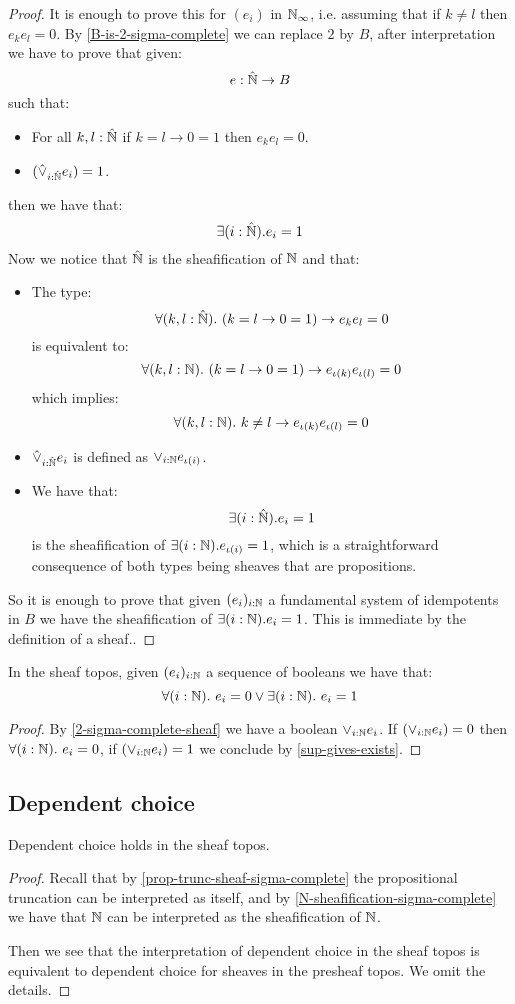 \begin{proof}
It is enough to prove this for $(e_i)$ in $\mathbb{N}_\infty$, i.e. assuming that if $k\not=l$ then $e_ke_l = 0$. By 
\cref{B-is-2-sigma-complete} we can replace $2$ by $B$, after interpretation we have to prove that given:
\[e:\hat{\mathbb{N}}\to B\] 
such that:
\begin{itemize}
\item For all $k,l:\hat{\mathbb{N}}$ if $k=l\to 0=1$ then $e_ke_l=0$.
\item $(\hat{\lor}_{i:\hat{\mathbb{N}}} e_i) = 1$.
\end{itemize}
then we have that:
\[\exists(i:\hat{\mathbb{N}}). e_i=1\]
Now we notice that $\hat{\mathbb{N}}$ is the sheafification of $\mathbb{N}$ and that:
\begin{itemize} 
\item The type:
\[\forall(k,l:\hat\N).\ (k=l\to 0=1)\to e_ke_l=0\]
is equivalent to:
\[\forall(k,l:\mathbb{N}).\ (k=l\to 0=1)\to e_{\iota(k)}e_{\iota(l)}=0\]
which implies:
\[\forall(k,l:\mathbb{N}).\ k\not=l\to e_{\iota(k)}e_{\iota(l)}=0\]
\item $\hat{\lor}_{i:\hat{\mathbb{N}}} e_i$ is defined as $\lor_{i:\mathbb{N}} e_{\iota(i)}$.
\item We have that:
\[\exists (i:\hat{\mathbb{N}}). e_i=1\]
is the sheafification of $\exists(i:\mathbb{N}).e_{\iota(i)} = 1$, which is a straightforward consequence of both types being sheaves that are propositions.
\end{itemize}
So it is enough to prove that given $(e_i)_{i:\mathbb{N}}$ a fundamental system of idempotents in $B$ we have the sheafification of $\exists(i:\mathbb{N}).e_i = 1$. This is immediate by the definition of a sheaf..
\end{proof}

\begin{theorem}[LPO]
In the sheaf topos, given $(e_i)_{i:\mathbb{N}}$ a sequence of booleans we have that:
\[\forall(i:\mathbb{N}).\ e_i=0 \lor \exists(i:\mathbb{N}).\ e_i=1\]
\end{theorem}

\begin{proof}
By \cref{2-sigma-complete-sheaf} we have a boolean $\lor_{i:\mathbb{N}}e_i$. If $(\lor_{i:\mathbb{N}}e_i) = 0$ then $\forall(i:\mathbb{N}).\ e_i=0$, if $(\lor_{i:\mathbb{N}}e_i) = 1$ we conclude by \cref{sup-gives-exists}.
\end{proof}


\subsection{Dependent choice}

\begin{theorem}[DC]
Dependent choice holds in the sheaf topos.
\end{theorem}

\begin{proof}
Recall that by \cref{prop-trunc-sheaf-sigma-complete} the propositional truncation can be interpreted as itself, and by \cref{N-sheafification-sigma-complete} we have that $\mathbb{N}$ can be interpreted as the sheafification of $\mathbb{N}$.

Then we see that the interpretation of dependent choice in the sheaf topos is equivalent to dependent choice for sheaves in the presheaf topos. We omit the details.
\end{proof}
